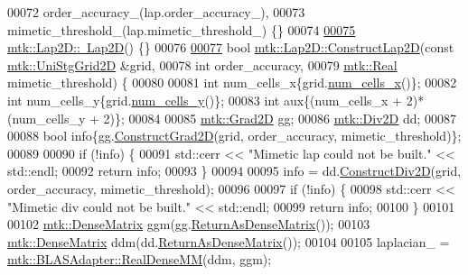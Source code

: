 \begin{DoxyCode}
00072   order\_accuracy\_(lap.order\_accuracy\_),
00073   mimetic\_threshold\_(lap.mimetic\_threshold\_) \{\}
00074 
\hypertarget{mtk__lap__2d_8cc_source_l00075}{}\hyperlink{classmtk_1_1Lap2D_a8ca8447a4da7a5ddcf826486992374a5}{00075} \hyperlink{classmtk_1_1Lap2D_a8ca8447a4da7a5ddcf826486992374a5}{mtk::Lap2D::~Lap2D}() \{\}
00076 
\hypertarget{mtk__lap__2d_8cc_source_l00077}{}\hyperlink{classmtk_1_1Lap2D_a188ee8fee643463affca7de2884711b1}{00077} \textcolor{keywordtype}{bool} \hyperlink{classmtk_1_1Lap2D_a188ee8fee643463affca7de2884711b1}{mtk::Lap2D::ConstructLap2D}(\textcolor{keyword}{const} 
      \hyperlink{classmtk_1_1UniStgGrid2D}{mtk::UniStgGrid2D} &grid,
00078                                 \textcolor{keywordtype}{int} order\_accuracy,
00079                                 \hyperlink{group__c01-roots_gac080bbbf5cbb5502c9f00405f894857d}{mtk::Real} mimetic\_threshold) \{
00080 
00081   \textcolor{keywordtype}{int} num\_cells\_x\{grid.\hyperlink{classmtk_1_1UniStgGrid2D_a2d182866a398aba8e4829590e85bf939}{num\_cells\_x}()\};
00082   \textcolor{keywordtype}{int} num\_cells\_y\{grid.\hyperlink{classmtk_1_1UniStgGrid2D_aed05a801cc9a76dba0ff203cea58a61a}{num\_cells\_y}()\};
00083   \textcolor{keywordtype}{int} aux\{(num\_cells\_x + 2)*(num\_cells\_y + 2)\};
00084 
00085   \hyperlink{classmtk_1_1Grad2D}{mtk::Grad2D} gg;
00086   \hyperlink{classmtk_1_1Div2D}{mtk::Div2D} dd;
00087 
00088   \textcolor{keywordtype}{bool} info\{gg.\hyperlink{classmtk_1_1Grad2D_a9771be954c59880e3d83f4d645378c00}{ConstructGrad2D}(grid, order\_accuracy, mimetic\_threshold)\};
00089 
00090   \textcolor{keywordflow}{if} (!info) \{
00091     std::cerr << \textcolor{stringliteral}{"Mimetic lap could not be built."} << std::endl;
00092     \textcolor{keywordflow}{return} info;
00093   \}
00094 
00095   info = dd.\hyperlink{classmtk_1_1Div2D_a4214055909a6b94fcb9d657cc839055f}{ConstructDiv2D}(grid, order\_accuracy, mimetic\_threshold);
00096 
00097   \textcolor{keywordflow}{if} (!info) \{
00098     std::cerr << \textcolor{stringliteral}{"Mimetic div could not be built."} << std::endl;
00099     \textcolor{keywordflow}{return} info;
00100   \}
00101 
00102   \hyperlink{classmtk_1_1DenseMatrix}{mtk::DenseMatrix} ggm(gg.\hyperlink{classmtk_1_1Grad2D_afa14fa1b84f05752027c1cef66381de8}{ReturnAsDenseMatrix}());
00103   \hyperlink{classmtk_1_1DenseMatrix}{mtk::DenseMatrix} ddm(dd.\hyperlink{classmtk_1_1Div2D_ae27437bb5ebb5552a786e501e4dcf51e}{ReturnAsDenseMatrix}());
00104 
00105   laplacian\_ = \hyperlink{classmtk_1_1BLASAdapter_acebd0e9bfe0bdd609c7fbea98ccfd3b5}{mtk::BLASAdapter::RealDenseMM}(ddm, ggm);

\end{DoxyCode}
